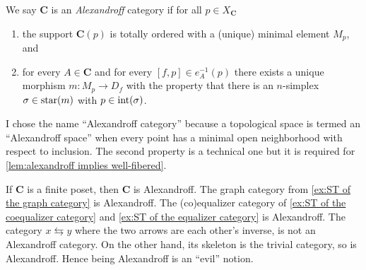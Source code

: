 \begin{definition}
\label{def:alexandroff cat}
We say $\mathbf{C}$ is an \emph{Alexandroff} category if for all $p \in X_{\mathbf{C}}$
\begin{enumerate}
	\item the support $\mathbf{C}(p)$ is totally ordered with a (unique) minimal element $M_p$, and
	\item for every $A \in \mathbf{C}$ and for every $[f,p] \in e_A^{-1}(p)$ there exists a unique morphism $m : M_p \to D_f$ with the property that there is an $n$-simplex $\sigma \in \operatorname{star}(m)$ with $p \in \operatorname{int}(\sigma)$.
\end{enumerate}
\end{definition}

\begin{remark}
I chose the name ``Alexandroff category'' because a topological space is termed an ``Alexandroff space'' when every point has a minimal open neighborhood with respect to inclusion. The second property is a technical one but it is required for \cref{lem:alexandroff implies well-fibered}.
\end{remark}


\begin{example}
If $\mathbf{C}$ is a finite poset, then $\mathbf{C}$ is Alexandroff. The graph category from \cref{ex:ST of the graph category} is Alexandroff. The (co)equalizer category of \cref{ex:ST of the coequalizer category} and \cref{ex:ST of the equalizer category} is Alexandroff. The category $x \leftrightarrows y$ where the two arrows are each other's inverse, is not an Alexandroff category. On the other hand, its skeleton is the trivial category, so is Alexandroff. Hence being Alexandroff is an ``evil'' notion.
\end{example}

